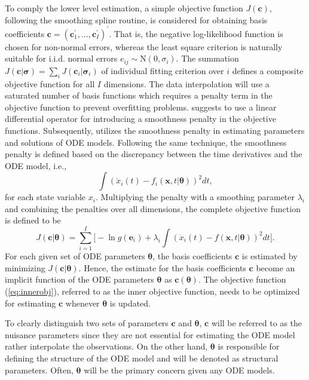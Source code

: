 To comply the lower level estimation, a simple objective function $J(\bm{c})$, following the smoothing spline routine, is considered for obtaining basis coefficients $\bm{c} = (\bm{c}^{\prime}_1,\ldots,\bm{c}^{\prime}_I)^{\prime}$. That is, the negative log-likelihood function is chosen for non-normal errors, whereas the least square criterion is naturally suitable for i.i.d. normal errors $e_{ij} \sim \text{N}(0,\sigma_{i})$. The summation $J(\bm{c}|\bm{\sigma}) = \sum_{i} J(\bm{c}_{i}|\bm{\sigma}_{i})$ of individual fitting criterion over $i$ defines a composite objective function for all $I$ dimensions. The data interpolation will use a saturated number of basis functions which requires a penalty term in the objective function to prevent overfitting problems. \cite{ramsayFDA} suggests to use a linear differential operator for introducing a smoothness penalty in the objective functions. Subsequently, \cite{Poyton2006} utilizes the smoothness penalty in estimating parameters and solutions of ODE models. Following the same technique, the smoothness penalty is defined based on the discrepancy between the time derivatives and the ODE model, i.e., 
 \begin{equation}
       \int (\dot{x}_{i}(t) - f_{i}(\bm{x},t|\bm{\theta}))^{2}dt,
 \end{equation}
 for each state variable $x_{i}$. Multiplying the penalty with a smoothing parameter $\lambda_{i}$ and combining the penalties over all dimensions, the complete objective function is defined to be 
 \begin{equation}
  J(\bm{c}|\bm{\theta}) = \sum_{i=1}^{I} \big[ - \ln g(\bm{e}_{i}) + \lambda_{i}\int (\dot{x}_{i}(t) - f(\bm{x},t|\bm{\theta}))^{2}dt\big].
  \label{eq:innerobj}
 \end{equation}
 For each given set of ODE parameters $\bm{\theta}$, the basis coefficients $\bm{c}$ is estimated by minimizing $J(\bm{c}|\bm{\theta})$. Hence, the estimate for the basis coefficients $\bm{c}$ become an implicit function of the ODE parameters $\bm{\theta}$ as $\bm{c}(\bm{\theta})$. The objective function (\ref{eq:innerobj}), referred to as the inner objective function, needs to be optimized for estimating $\bm{c}$ whenever $\bm{\theta}$ is updated. 

To clearly distinguish two sets of parameters $\bm{c}$ and $\bm{\theta}$, $\bm{c}$ will be referred to as the nuisance parameters since they are not essential for estimating the ODE model rather interpolate the observations. On the other hand, $\bm{\theta}$ is responsible for defining the structure of the ODE model and will be denoted as structural parameters. Often, $\bm{\theta}$ will be the primary concern given any ODE models. 

